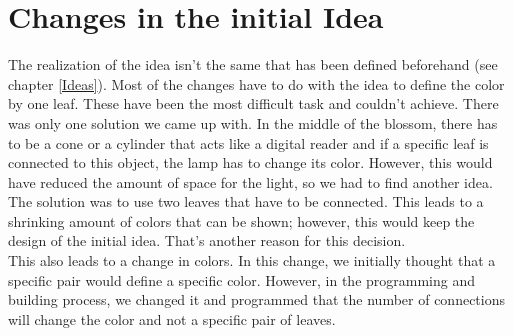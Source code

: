\documentclass[00_doc.tex]{subfiles}
\begin{document}
    \section{Changes in the initial Idea}
    \begin{flushleft}
        The realization of the idea isn't the same that has been defined beforehand (see chapter \ref{Ideas}). 
        Most of the changes have to do with the idea to define the color by one leaf. These have been the 
        most difficult task and couldn't achieve. There was only one solution we came up with. In the middle
        of the blossom, there has to be a cone or a cylinder that acts like a digital reader and if a specific
        leaf is connected to this object, the lamp has to change its color. However, this would have 
        reduced the amount of space for the light, so we had to find another idea. The solution was to use
        two leaves that have to be connected. This leads to a shrinking amount of 
        colors that can be shown; however, this would keep the design of the initial idea. That's 
        another reason for this decision.\\

        This also leads to a change in colors. In this change, we initially thought that a specific pair 
        would define a specific color. However, in the programming and building process, we changed it 
        and programmed that the number of connections will change the color and not a specific pair
        of leaves.        
    \end{flushleft}
\end{document}
